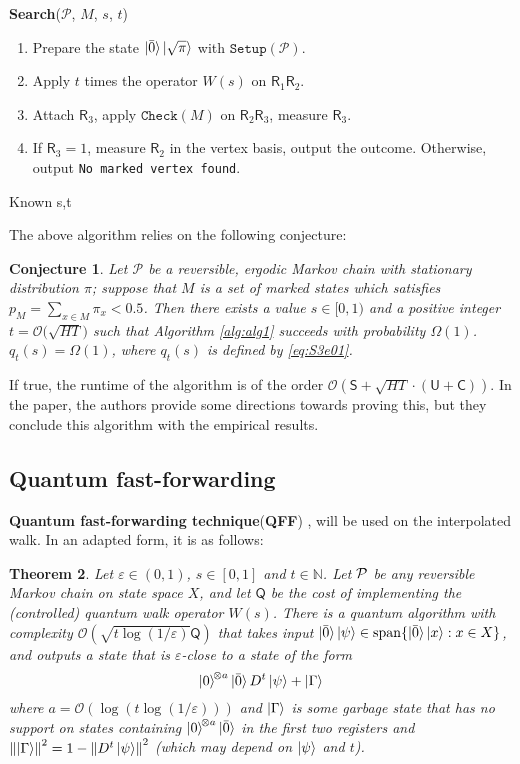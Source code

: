 \documentclass{article}
\newcommand{\eps}{\varepsilon}
\newcommand{\nrm}[1]{\left\lVert #1 \right\rVert}
\newcommand{\bigO}[1]{\mathcal{O}\left( #1 \right)}
\newcommand{\bigObig}[1]{\mathcal{O}\big( #1 \big)}
\newcommand{\PM}{\mathcal{P}}
\newtheorem{theorem}{Theorem}
\newtheorem{conj}[theorem]{Conjecture}
\renewcommand{\check}{\mathtt{Check}}
\newcommand{\setup}{\mathtt{Setup}}
\newcommand{\checkingcost}{\mathsf{C}}
\newcommand{\setupcost}{\mathsf{S}}
\newcommand{\updatecost}{\mathsf{U}}
\newcommand{\Reg}{\mathsf{R}}
\newcommand{\barO}{\bar{0}}
\begin{document}
\begin{algorithm}[H]
	\textbf{Search}($ \PM $, $ M $, $ s $, $ t $) %
	
	\begin{enumerate}
		\item Prepare the state $\ket{\barO}\ket{\sqrt \pi}$ with $ \setup(\PM) $.
		\item Apply $ t $ times  the operator $ W(s) $  on $ \Reg_1 \Reg_2 $.
		\item Attach $ \Reg_3 $, apply $ \check(M) $ on $ \Reg_2 \Reg_3 $, measure $ \Reg_3 $.
		\item If $ \Reg_3=1 $, measure $ \Reg_2 $ in the vertex basis, output the outcome. Otherwise, output \texttt{No marked vertex found}.
	\end{enumerate}
	
	\caption{Known s,t}\label{alg:alg1}
\end{algorithm}
The above algorithm relies on the following conjecture:
\begin{conj}
\label{conj:1}
	Let  $  \PM$ be a reversible, ergodic Markov chain with stationary distribution $\pi$;  suppose that   $ M $ is a set of marked states which  satisfies $p_M= \sum_{x\in M} \pi_x < 0.5 $. Then
	there exists a  value $ s \in [0,1) $ and a positive  integer $ t = \bigObig{\sqrt{HT}} $ such that
	Algorithm \ref{alg:alg1} succeeds with probability $ \Omega(1) $.
	$ q_t(s) = \Omega(1) $, where $ q_t(s) $ is defined by \eqref{eq:S3e01}.
\end{conj}
If true, the runtime of the algorithm is of the order $ \bigO {\setupcost + \sqrt{HT} \cdot (\updatecost + \checkingcost)}$. 
In the paper, the authors provide some directions towards proving this, but they conclude this algorithm with the empirical results.
\subsection{Quantum fast-forwarding}\label{subsec:fast-forwarding}
\textbf{Quantum fast-forwarding technique}(\textbf{QFF}) \cite{Apers2018QuantumFM}, will be used on the interpolated walk. In an adapted form, it is as follows:

\begin{theorem}\label{thm:fast-forwarding}
Let $\eps\in(0,1)$, $s\in[0,1]$ and $t\in\mathbb{N}$. Let $\cal P$ be any reversible Markov chain on state space $X$, and let $\mathsf{Q}$ be the cost of implementing the (controlled) quantum walk operator $W(s)$. There is a quantum algorithm with complexity $\bigO{\sqrt{t\log(1/\eps)}\mathsf{Q}}$ that takes input $\ket{\barO}\ket{\psi}\in \mathrm{span}\{\ket{\barO}\ket{x}:x\in X\}$, and outputs a state that is $\eps$-close to a state of the form
$$\ket{0}^{\!\otimes a}\ket{\barO}D^t\ket{\psi}+\ket{\Gamma}$$
where $a=\bigO{\log(t\log(1/\eps))}$ and $\ket{\Gamma}$ is some garbage state that has no support on states containing $\ket{0}^{\!\otimes a}\ket{\barO}$ in the first two registers and $\nrm{\ket{\Gamma}}^2 = 1 - \nrm{D^t\ket{\psi}}^2$ (which may depend on $\ket{\psi}$ and $t$). 
\end{theorem}
\end{document}
